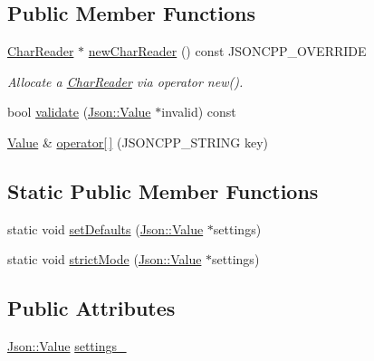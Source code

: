 \subsection*{Public Member Functions}
\begin{DoxyCompactItemize}
\item 
\hyperlink{class_json_1_1_char_reader}{Char\+Reader} $\ast$ \hyperlink{class_json_1_1_char_reader_builder_a3a262fcc76c1eb8eebfd4718fb4e9722}{new\+Char\+Reader} () const J\+S\+O\+N\+C\+P\+P\+\_\+\+O\+V\+E\+R\+R\+I\+DE
\begin{DoxyCompactList}\small\item\em Allocate a \hyperlink{class_json_1_1_char_reader}{Char\+Reader} via operator new(). \end{DoxyCompactList}\item 
bool \hyperlink{class_json_1_1_char_reader_builder_a3d233735a1e4b3c9a2cb9c68f972c02a}{validate} (\hyperlink{class_json_1_1_value}{Json\+::\+Value} $\ast$invalid) const 
\item 
\hyperlink{class_json_1_1_value}{Value} \& \hyperlink{class_json_1_1_char_reader_builder_a84b35ef443340c06c0aa7b47851d8d86}{operator\mbox{[}$\,$\mbox{]}} (J\+S\+O\+N\+C\+P\+P\+\_\+\+S\+T\+R\+I\+NG key)
\end{DoxyCompactItemize}
\subsection*{Static Public Member Functions}
\begin{DoxyCompactItemize}
\item 
static void \hyperlink{class_json_1_1_char_reader_builder_a03ff031e06aabff989ab4addc87294ab}{set\+Defaults} (\hyperlink{class_json_1_1_value}{Json\+::\+Value} $\ast$settings)
\item 
static void \hyperlink{class_json_1_1_char_reader_builder_a9c19e3c5475f9072d527810d4bf56749}{strict\+Mode} (\hyperlink{class_json_1_1_value}{Json\+::\+Value} $\ast$settings)
\end{DoxyCompactItemize}
\subsection*{Public Attributes}
\begin{DoxyCompactItemize}
\item 
\hyperlink{class_json_1_1_value}{Json\+::\+Value} \hyperlink{class_json_1_1_char_reader_builder_ac69b7911ad64c171c51ebaf2ea26d958}{settings\+\_\+}
\end{DoxyCompactItemize}


